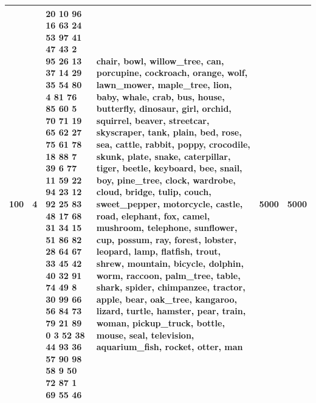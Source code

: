 \begin{tabular}{rrllrr}
100 & 4 & 20 10 96 16 63 24 53 97 41 47 43 2 95 26 13 37 14 29 35 54 80 4 81 76 85 60 5 70 71 19 65 62 27 75 61 78 18 88 7 39 6 77 11 59 22 94 23 12 92 25 83 48 17 68 31 34 15 51 86 82 28 64 67 33 45 42 40 32 91 74 49 8 30 99 66 56 84 73 79 21 89 0 3 52 38 44 93 36 57 90 98 58 9 50 72 87 1 69 55 46 & chair, bowl, willow_tree, can, porcupine, cockroach, orange, wolf, lawn_mower, maple_tree, lion, baby, whale, crab, bus, house, butterfly, dinosaur, girl, orchid, squirrel, beaver, streetcar, skyscraper, tank, plain, bed, rose, sea, cattle, rabbit, poppy, crocodile, skunk, plate, snake, caterpillar, tiger, beetle, keyboard, bee, snail, boy, pine_tree, clock, wardrobe, cloud, bridge, tulip, couch, sweet_pepper, motorcycle, castle, road, elephant, fox, camel, mushroom, telephone, sunflower, cup, possum, ray, forest, lobster, leopard, lamp, flatfish, trout, shrew, mountain, bicycle, dolphin, worm, raccoon, palm_tree, table, shark, spider, chimpanzee, tractor, apple, bear, oak_tree, kangaroo, lizard, turtle, hamster, pear, train, woman, pickup_truck, bottle, mouse, seal, television, aquarium_fish, rocket, otter, man & 5000 & 5000 \\
\bottomrule
\end{tabular}
